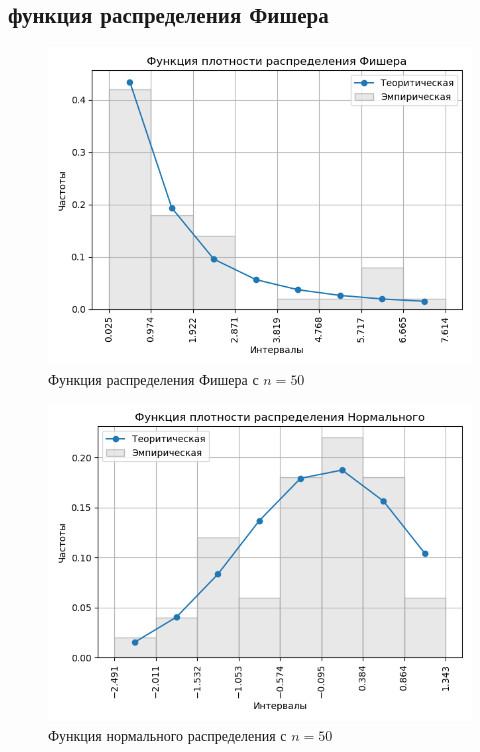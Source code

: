\documentclass[a4]{article}
\begin{document}
\subsection{функция распределения Фишера}
\begin{center}

\begin{figure}[H]
\caption{Функция распределения Фишера с $ n = 50$}
\includegraphics[width=\textwidth]{output/task1/fisher_50_histogram.png}
\end{figure}

\begin{figure}[H]
\caption{Функция нормального распределения с $ n = 50$}
\includegraphics[width=\textwidth]{output/task1/norm_50_histogram.png}
\end{figure}


\end{center}
\end{document}
